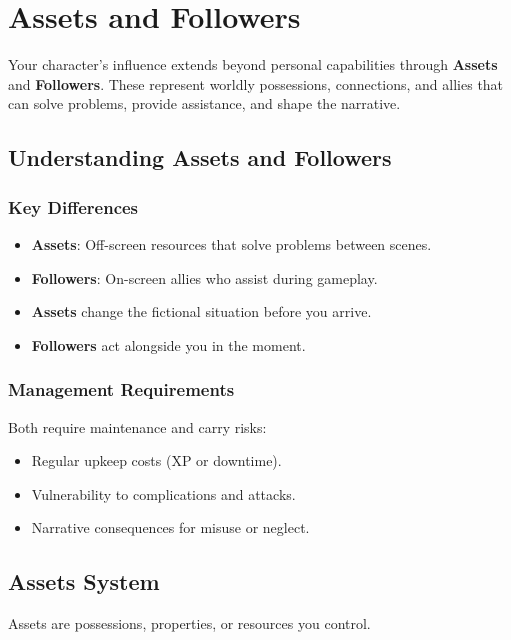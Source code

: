 \chapter{Assets and Followers}
\label{ch:assets-followers}

Your character's influence extends beyond personal capabilities through \textbf{Assets} and \textbf{Followers}. These represent worldly possessions, connections, and allies that can solve problems, provide assistance, and shape the narrative.

\section{Understanding Assets and Followers}

\subsection*{Key Differences}
\begin{itemize}
\item \textbf{Assets}: Off-screen resources that solve problems between scenes.
\item \textbf{Followers}: On-screen allies who assist during gameplay.
\item \textbf{Assets} change the fictional situation before you arrive.
\item \textbf{Followers} act alongside you in the moment.
\end{itemize}

\subsection*{Management Requirements}
Both require maintenance and carry risks:
\begin{itemize}
\item Regular upkeep costs (XP or downtime).
\item Vulnerability to complications and attacks.
\item Narrative consequences for misuse or neglect.
\end{itemize}

\section{Assets System}

Assets are possessions, properties, or resources you control.

